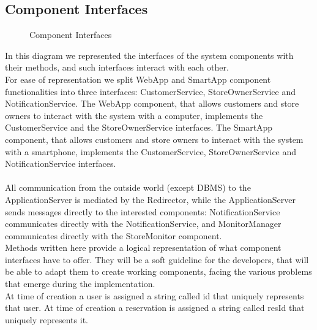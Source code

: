 \subsection{Component Interfaces}
\begin{figure}[H]
	\noindent
	\caption{Component Interfaces} %
\end{figure}
In this diagram we represented the interfaces of the system components with their methods, and such interfaces interact with each other.\\
For ease of representation we split WebApp and SmartApp component functionalities into three interfaces: CustomerService, StoreOwnerService and NotificationService. The WebApp component, that allows customers and store owners to interact with the system with a computer, implements the CustomerService and the StoreOwnerService interfaces. The SmartApp component, that allows customers and store owners to interact with the system with a smartphone, implements the CustomerService, StoreOwnerService and NotificationService interfaces.\\\\
All communication from the outside world (except DBMS) to the ApplicationServer is mediated by the Redirector, while the ApplicationServer sends messages directly to the interested components: NotificationService communicates directly with the NotificationService, and MonitorManager communicates directly with the StoreMonitor component.\\
Methods written here provide a logical representation of what component interfaces have to offer. They will be a soft guideline for the developers, that will be able to adapt them to create working components, facing the various problems that emerge during the implementation.\\
At time of creation a user is assigned a string called id that uniquely represents that user. At time of creation a reservation is assigned a string called resId that uniquely represents it.\\
